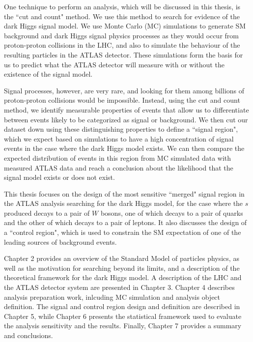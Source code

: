 One technique to perform an analysis, which will be discussed in this thesis, is the ``cut and count" method. We use this method to search for evidence of the dark Higgs signal model. We use Monte Carlo (MC) simulations to generate SM background and dark Higgs signal physics processes as they would occur from proton-proton collisions in the LHC, and also to simulate the behaviour of the resulting particles in the ATLAS detector. These simulations form the basis for us to predict what the ATLAS detector will measure with or without the existence of the signal model.

Signal processes, however, are very rare, and looking for them among billions of proton-proton collisions would be impossible. Instead, using the cut and count method, we identify measurable properties of events that allow us to differentiate between events likely to be categorized as signal or background. We then cut our dataset down using these distinguishing properties to define a ``signal region", which we expect based on simulations to have a high concentration of signal events in the case where the dark Higgs model exists. We can then compare the expected distribution of events in this region from MC simulated data with measured ATLAS data and reach a conclusion about the likelihood that the signal model exists or does not exist.

This thesis focuses on the design of the most sensitive ``merged" signal region in the ATLAS analysis searching for the dark Higgs model, for the case where the $s$ produced decays to a pair of $W$ bosons, one of which decays to a pair of quarks and the other of which decays to a pair of leptons. It also discusses the design of a ``control region", which is used to constrain the SM expectation of one of the leading sources of background events.

Chapter 2 provides an overview of the Standard Model of particles physics, as well as the motivation for searching beyond its limits, and a description of the theoretical framework for the dark Higgs model. A description of the LHC and the ATLAS detector system are presented in Chapter 3. Chapter 4 describes analysis preparation work, inlcuding MC simulation and analysis object definition. The signal and control region design and definition are described in Chapter 5, while Chapter 6 presents the statistical framework used to evaluate the analysis sensitivity and the results. Finally, Chapter 7 provides a summary and conclusions.
